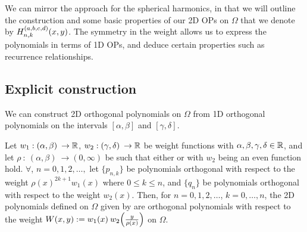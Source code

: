 We can mirror the approach for the spherical harmonics, in that we will outline the construction and some basic properties of our 2D OPs on $\Omega$ that we denote by $H_{n,k}^{(a,b,c,d)}(x,y)$. The symmetry in the weight allows us to express the polynomials in terms of 1D OPs, and deduce certain properties such as recurrence relationships. 

\subsection{Explicit construction}

We can construct 2D orthogonal polynomials on $\Omega$ from 1D orthogonal polynomials on the intervals $[\alpha,\beta]$ and $[\gamma,\delta]$. 

\begin{proposition}\label{prop:ds:construction}
	Let $w_1 : (\alpha,\beta) \: \to \mathbb{R}$, $w_2 : (\gamma,\delta) \: \to \mathbb{R}$ be weight functions with $\alpha,\beta,\gamma,\delta \in \mathbb{R}$, and let $\rho \: : \: (\alpha,\beta) \: \to (0,\infty)$ be such that either  or  with $w_2$ being an even function hold.
$\forall$, $n = 0,1,2,\dots, $ let $\{p_{n,k}\}$ be polynomials orthogonal with respect to the weight $\rho(x)^{2k+1} w_1(x)$ where $0 \le k \le n$, and $\{q_{n}\}$ be polynomials orthogonal with respect to the weight $w_2(x)$. Then, for $n = 0,1,2,\dots$, $k = 0,\dots,n$, the 2D polynomials defined on $\Omega$ given by
are orthogonal polynomials with respect to the weight $W(x,y) := w_1(x) \: w_2\fpr(\frac{y}{\rho(x)})$ on $\Omega$. 
\end{proposition}


